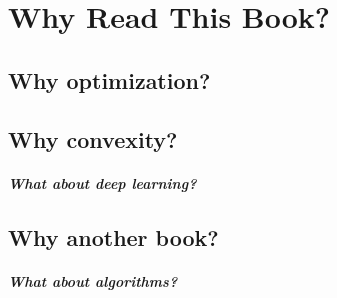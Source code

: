 \chapter{Why Read This Book?}
\label{chap:why_this_book}

\section{Why optimization?}


\section{Why convexity?}


\paragraph{What about deep learning?}

\section{Why another book?}

\paragraph{What about algorithms?}

